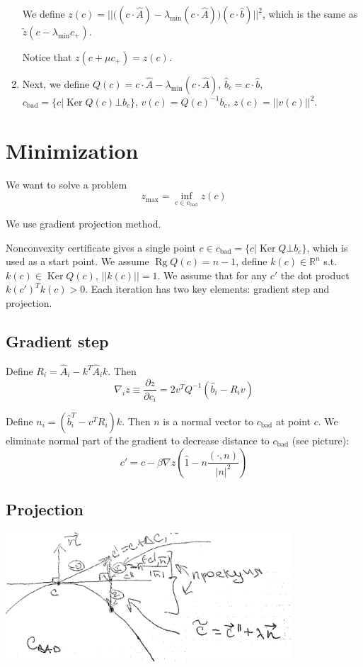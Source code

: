 \documentclass[a4paper]{article}
\DeclareMathOperator{\Rg}{Rg}
\DeclareMathOperator{\Ker}{Ker}
\newcommand{\cbad}{c_{\mathrm{bad}}}
\begin{document}
\begin{enumerate}
We define $z(c)=||\big((c\cdot \hat{A})-\lambda_{\min}(c\cdot \hat{A})\big)(c\cdot \hat{b})||^2$, which is the same as $\tilde{z}(c-\lambda_{\min}c_+)$.

Notice that $z(c+\mu c_+)=z(c)$.

\item Next, we define $Q(c)=c\cdot \hat{A}-\lambda_{\min}(c\cdot \hat{A})$, $\hat{b}_c=c\cdot \hat{b}$, $\cbad=\{c\big|\Ker Q(c)\bot b_c\}$, $v(c)=Q(c)^{-1}b_c$, $z(c)=||v(c)||^2$.

\end{enumerate}

\section*{Minimization}
We want to solve a problem
\begin{equation}
z_{\max}=\inf\limits_{c\in\cbad}z(c)
\end{equation}

We use gradient projection method.

Nonconvexity certificate gives a single point $c\in \cbad=\{c\big| \Ker Q\bot b_c\}$, which is used as a start point. We assume $\Rg Q(c)=n-1$, define $k(c)\in\mathbb{R}^n$ s.t. $k(c)\in\Ker Q(c)$, $||k(c)||=1$. We assume that for any $c'$ the dot product $k(c')^Tk(c)>0$.
Each iteration has two key elements: gradient step and projection.

\subsection*{Gradient step}
Define $R_i=\hat{A}_i-k^T\hat{A}_ik$. Then
$$\nabla_iz\equiv \frac{\partial z}{\partial c_i}=2v^TQ^{-1}(\hat{b}_i-R_iv)$$

Define $n_i=\left(\hat{b}_i^T-v^TR_i\right)k$. Then $n$ is a normal vector to $\cbad$ at point $c$. We eliminate normal part of the gradient to decrease distance to $\cbad$ (see picture):
$$c'=c-\beta\nabla z(\hat{1}-n\frac{(\cdot, n)}{|n|^2})$$


\subsection*{Projection}
\includegraphics[width=0.8\textwidth]{c_bad_continuum.png}
\end{document}
